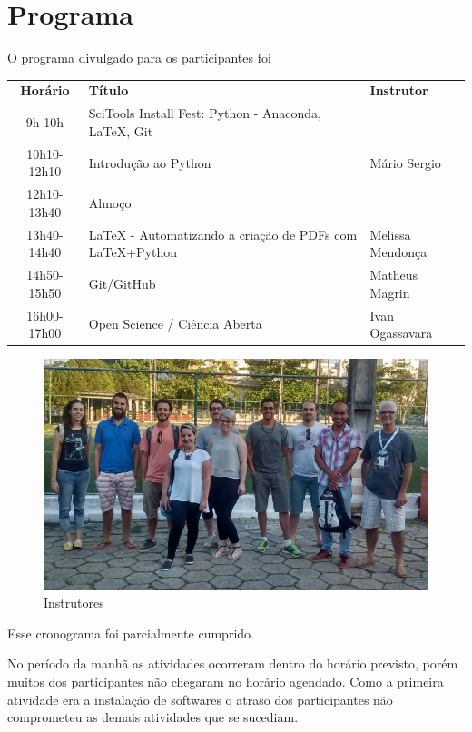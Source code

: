 \documentclass[12pt]{article}
\begin{document}
\newpage

\section*{Programa}

O programa divulgado para os participantes foi

\begin{tabular}{cp{}l}
  \textbf{Horário} & \textbf{Título} & \textbf{Instrutor} \\
  9h-10h & SciTools Install Fest: Python - Anaconda, LaTeX, Git & \\
  10h10-12h10 & Introdução ao Python & Mário Sergio \\
  12h10-13h40 & Almoço \\
  13h40-14h40 & LaTeX - Automatizando a criação de PDFs com LaTeX+Python & Melissa Mendonça \\
  14h50-15h50 & Git/GitHub & Matheus Magrin \\
  16h00-17h00 & Open Science / Ciência Aberta & Ivan Ogassavara \\
\end{tabular}

\begin{figure}[!htb]
\includegraphics[width=\textwidth]{../../media/photos/pre4-cut}
\caption{Instrutores}
\end{figure}

Esse cronograma foi parcialmente cumprido.

No período da manhã as atividades ocorreram dentro do horário previsto, porém muitos dos participantes
não chegaram no horário agendado. Como a primeira atividade era a instalação de
softwares o atraso dos participantes não comprometeu as demais atividades que se
sucediam.
\end{document}
